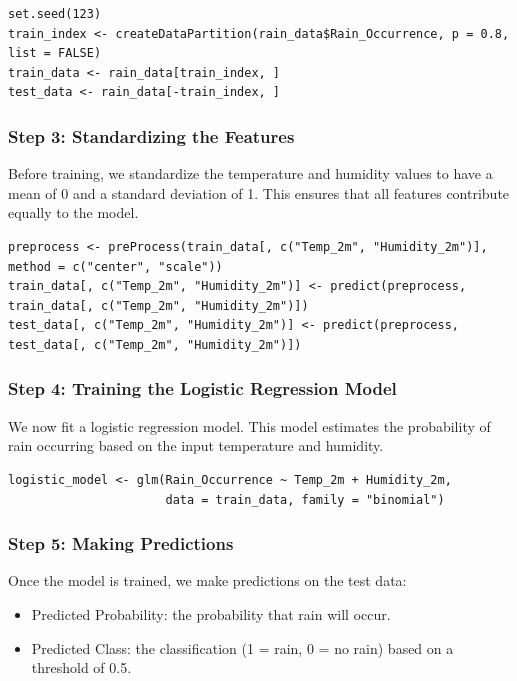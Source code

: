 \begin{verbatim}
set.seed(123)
train_index <- createDataPartition(rain_data$Rain_Occurrence, p = 0.8, 
list = FALSE)
train_data <- rain_data[train_index, ]
test_data <- rain_data[-train_index, ]
\end{verbatim}

\subsubsection*{Step 3: Standardizing the Features}

Before training, we standardize the temperature and humidity values to have a mean of 0 and a standard deviation of 1. This ensures that all features contribute equally to the model.

\begin{verbatim}
preprocess <- preProcess(train_data[, c("Temp_2m", "Humidity_2m")], 
method = c("center", "scale"))
train_data[, c("Temp_2m", "Humidity_2m")] <- predict(preprocess, 
train_data[, c("Temp_2m", "Humidity_2m")])
test_data[, c("Temp_2m", "Humidity_2m")] <- predict(preprocess, 
test_data[, c("Temp_2m", "Humidity_2m")])
\end{verbatim}

\subsubsection*{Step 4: Training the Logistic Regression Model}

We now fit a logistic regression model. This model estimates the probability of rain occurring based on the input temperature and humidity.

\begin{verbatim}
logistic_model <- glm(Rain_Occurrence ~ Temp_2m + Humidity_2m,
                      data = train_data, family = "binomial")
\end{verbatim}

\subsubsection*{Step 5: Making Predictions}

Once the model is trained, we make predictions on the test data:

\begin{itemize}
  \item Predicted Probability: the probability that rain will occur.
  \item Predicted Class: the classification (1 = rain, 0 = no rain) based on a threshold of 0.5.
\end{itemize}

